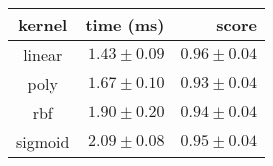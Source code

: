 \begin{tabular}{crr}
\toprule
\textbf{kernel} & \textbf{time (ms)} & \textbf{score}\\
\midrule
linear & $1.43 \pm 0.09$ & $0.96 \pm 0.04$\\
poly & $1.67 \pm 0.10$ & $0.93 \pm 0.04$\\
rbf & $1.90 \pm 0.20$ & $0.94 \pm 0.04$\\
sigmoid & $2.09 \pm 0.08$ & $0.95 \pm 0.04$\\
\bottomrule
\end{tabular}
